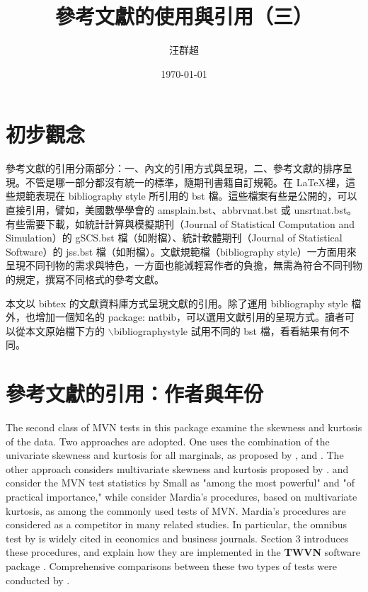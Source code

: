 \usepackage{natbib}
\title{ {\MB 參考文獻的使用與引用（三）}}		%
\author{{\SM 汪群超}}						%
\date{{\TT \today }} 							

\maketitle
\fontsize{12}{22pt}\selectfont 
\section{初步觀念}
參考文獻的引用分兩部分：一、內文的引用方式與呈現，二、參考文獻的排序呈現。不管是哪一部分都沒有統一的標準，隨期刊書籍自訂規範。在   \LaTeX 裡，這些規範表現在 bibliography style 所引用的 bst 檔。這些檔案有些是公開的，可以直接引用，譬如，美國數學學會的 amsplain.bst、abbrvnat.bst 或 unsrtnat.bst。有些需要下載，如統計計算與模擬期刊（Journal of Statistical Computation and Simulation）的 gSCS.bst 檔（如附檔）、統計軟體期刊（Journal of Statistical Software）的 jss.bst 檔（如附檔）。文獻規範檔（bibliography style）一方面用來呈現不同刊物的需求與特色，一方面也能減輕寫作者的負擔，無需為符合不同刊物的規定，撰寫不同格式的參考文獻。

本文以 bibtex 的文獻資料庫方式呈現文獻的引用。除了運用 bibliography style 檔外，也增加一個知名的 package: natbib，可以選用文獻引用的呈現方式。讀者可以從本文原始檔下方的 $\backslash$bibliographystyle  試用不同的 bst 檔，看看結果有何不同。

\section{參考文獻的引用：作者與年份}
The second class of MVN tests in this package examine the skewness and kurtosis of the data. Two approaches are adopted. One uses the combination of the univariate skewness and kurtosis for all marginals, as proposed by \cite{SMALL:1980}, and \cite{DOORNIK:2008}. The other approach considers multivariate skewness and kurtosis proposed by \cite{MARDIA:1970}.   \cite{FOSTER:1981} and \cite{HORSWELL:1990} consider the MVN test statistics by Small as "among the most powerful" and "of practical importance,"  while \cite{MM} consider Mardia's procedures, based on multivariate kurtosis, as among the commonly used tests of MVN.  Mardia's procedures are considered as a competitor  in many related studies.
In particular, the omnibus test by \cite{DOORNIK:2008} is widely cited in economics and business journals. Section 3 introduces these procedures, and explain how they are implemented in the \textbf{TWVN} software package \cite{WH}. Comprehensive  comparisons between these two types of tests were conducted by \cite{HORSWELL:1992}.

